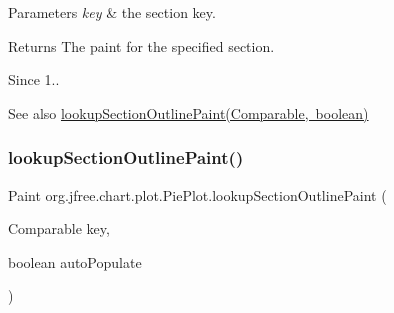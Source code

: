 \begin{DoxyParams}{Parameters}
{\em key} & the section key.\\
\hline
\end{DoxyParams}
\begin{DoxyReturn}{Returns}
The paint for the specified section.
\end{DoxyReturn}
\begin{DoxySince}{Since}
1..
\end{DoxySince}
\begin{DoxySeeAlso}{See also}
\mbox{\hyperlink{classorg_1_1jfree_1_1chart_1_1plot_1_1_pie_plot_a929b678054fb2b30eba6a91120eceed6}{lookup\+Section\+Outline\+Paint(\+Comparable, boolean)}} 
\end{DoxySeeAlso}
\mbox{\label{classorg_1_1jfree_1_1chart_1_1plot_1_1_pie_plot_a929b678054fb2b30eba6a91120eceed6}} 
\subsubsection{\texorpdfstring{lookup\+Section\+Outline\+Paint()}{lookupSectionOutlinePaint()}\hspace{0.1cm}{\footnotesize\ttfamily [2/2]}}
{\footnotesize\ttfamily Paint org.\+jfree.\+chart.\+plot.\+Pie\+Plot.\+lookup\+Section\+Outline\+Paint (\begin{DoxyParamCaption}\item[{Comparable}]{key,  }\item[{boolean}]{auto\+Populate }\end{DoxyParamCaption})\hspace{0.3cm}{\ttfamily [protected]}}

